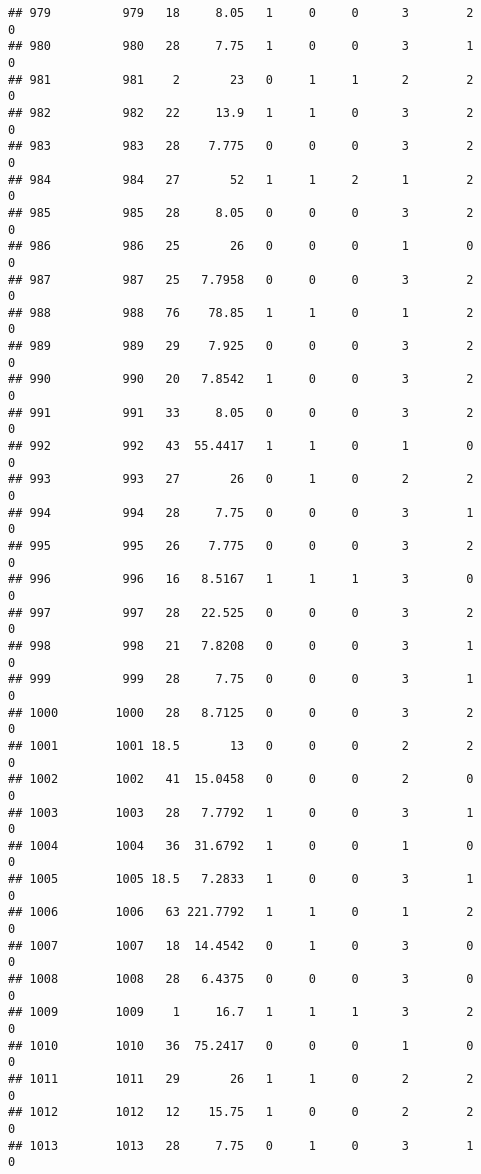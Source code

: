\documentclass[
]{article}
\begin{document}
\begin{verbatim}
## 979          979   18     8.05   1     0     0      3        2         0
## 980          980   28     7.75   1     0     0      3        1         0
## 981          981    2       23   0     1     1      2        2         0
## 982          982   22     13.9   1     1     0      3        2         0
## 983          983   28    7.775   0     0     0      3        2         0
## 984          984   27       52   1     1     2      1        2         0
## 985          985   28     8.05   0     0     0      3        2         0
## 986          986   25       26   0     0     0      1        0         0
## 987          987   25   7.7958   0     0     0      3        2         0
## 988          988   76    78.85   1     1     0      1        2         0
## 989          989   29    7.925   0     0     0      3        2         0
## 990          990   20   7.8542   1     0     0      3        2         0
## 991          991   33     8.05   0     0     0      3        2         0
## 992          992   43  55.4417   1     1     0      1        0         0
## 993          993   27       26   0     1     0      2        2         0
## 994          994   28     7.75   0     0     0      3        1         0
## 995          995   26    7.775   0     0     0      3        2         0
## 996          996   16   8.5167   1     1     1      3        0         0
## 997          997   28   22.525   0     0     0      3        2         0
## 998          998   21   7.8208   0     0     0      3        1         0
## 999          999   28     7.75   0     0     0      3        1         0
## 1000        1000   28   8.7125   0     0     0      3        2         0
## 1001        1001 18.5       13   0     0     0      2        2         0
## 1002        1002   41  15.0458   0     0     0      2        0         0
## 1003        1003   28   7.7792   1     0     0      3        1         0
## 1004        1004   36  31.6792   1     0     0      1        0         0
## 1005        1005 18.5   7.2833   1     0     0      3        1         0
## 1006        1006   63 221.7792   1     1     0      1        2         0
## 1007        1007   18  14.4542   0     1     0      3        0         0
## 1008        1008   28   6.4375   0     0     0      3        0         0
## 1009        1009    1     16.7   1     1     1      3        2         0
## 1010        1010   36  75.2417   0     0     0      1        0         0
## 1011        1011   29       26   1     1     0      2        2         0
## 1012        1012   12    15.75   1     0     0      2        2         0
## 1013        1013   28     7.75   0     1     0      3        1         0

\end{verbatim}
\end{document}
